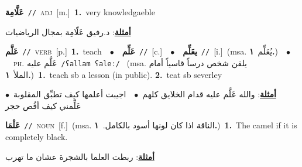 \documentclass[10pt,a4paper,twoside]{article} %
\begin{document}
\begin{multicols}{2}
{\setlength\topsep{0pt}\textbf{\foreignlanguage{arabic}{عَلَّامِة}}\ {\color{gray}\texttt{//}\color{black}}\ \textsc{adj}\ [m.]\ \textbf{1.}~very knowledgaeble\  \begin{flushright}\color{gray}\foreignlanguage{arabic}{\textbf{\underline{\foreignlanguage{arabic}{أمثلة}}}: د.رفيق عَلّامِة بمجال الرياضيات}\end{flushright}\color{black}} \vspace{2mm}

{\setlength\topsep{0pt}\textbf{\foreignlanguage{arabic}{عَلَّم}}\ {\color{gray}\texttt{//}\color{black}}\ \textsc{verb}\ [p.]\ \textbf{1.}~teach\ \ $\bullet$\ \ \setlength\topsep{0pt}\textbf{\foreignlanguage{arabic}{عَلِّم}}\ {\color{gray}\texttt{//}\color{black}}\ [c.]\ \ $\bullet$\ \ \setlength\topsep{0pt}\textbf{\foreignlanguage{arabic}{يعَلِّم}}\ {\color{gray}\texttt{//}\color{black}}\ [i.]\ \color{gray}(msa. \foreignlanguage{arabic}{يُعَلِّم}~\foreignlanguage{arabic}{\textbf{١.}})\color{black}\ \ $\bullet$\ \ \textsc{ph.} \color{gray} \foreignlanguage{arabic}{عَلَّم عليه}\color{black}\ {\color{gray}\texttt{/{\sffamily ʕallam ʕaleː}/}\color{black}}\ \color{gray} (msa. \foreignlanguage{arabic}{يلقن شخص درساً قاسياً أمام الملأ}~\foreignlanguage{arabic}{\textbf{١.}})\color{black}\ \textbf{1.}~teach sb a lesson (in public).  \textbf{2.}~teat sb severley\  \begin{flushright}\color{gray}\foreignlanguage{arabic}{\textbf{\underline{\foreignlanguage{arabic}{أمثلة}}}: والله عَلَّم عليه قدام الخلايق كلهم\ $\bullet$\ \  اجيبت أعلمها كيف تطبِّق المقلوبة\ $\bullet$\ \  عَلِّمني كيف أقُص حجر}\end{flushright}\color{black}} \vspace{2mm}

{\setlength\topsep{0pt}\textbf{\foreignlanguage{arabic}{عَلْمَا}}\ {\color{gray}\texttt{//}\color{black}}\ \textsc{noun}\ [f.]\ \color{gray}(msa. \foreignlanguage{arabic}{الناقة اذا كان لونها أسود بالكامل.}~\foreignlanguage{arabic}{\textbf{١.}})\color{black}\ \textbf{1.}~The camel if it is completely black.\  \begin{flushright}\color{gray}\foreignlanguage{arabic}{\textbf{\underline{\foreignlanguage{arabic}{أمثلة}}}: ربطت العلما بالشجرة عشان ما تهرب}\end{flushright}\color{black}} \vspace{2mm}


\end{multicols}
\end{document}
